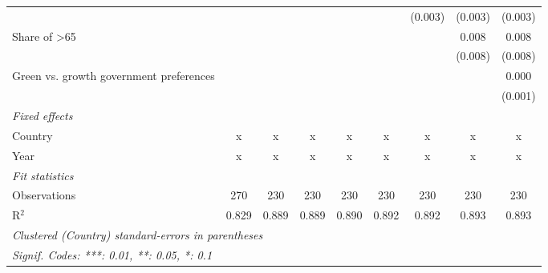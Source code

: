 \begin{table}[htbp]
\begin{tabular}{lcccccccc}
                                                            &         &         &         &         &         & (0.003) & (0.003) & (0.003)\\   
      Share of >65                                          &         &         &         &         &         &         & 0.008   & 0.008\\   
                                                            &         &         &         &         &         &         & (0.008) & (0.008)\\   
      Green vs. growth government preferences               &         &         &         &         &         &         &         & 0.000\\   
                                                            &         &         &         &         &         &         &         & (0.001)\\   
      \emph{Fixed effects}\\
      Country                                               & x       & x       & x       & x       & x       & x       & x       & x\\  
      Year                                                  & x       & x       & x       & x       & x       & x       & x       & x\\  
      \midrule \emph{Fit statistics}\\
      Observations                                          & 270     & 230     & 230     & 230     & 230     & 230     & 230     & 230\\  
      R$^2$                                                 & 0.829   & 0.889   & 0.889   & 0.890   & 0.892   & 0.892   & 0.893   & 0.893\\  
      \midrule
      \multicolumn{9}{l}{\emph{Clustered (Country) standard-errors in parentheses}}\\
      \multicolumn{9}{l}{\emph{Signif. Codes: ***: 0.01, **: 0.05, *: 0.1}}\\
   \end{tabular}
\end{table}


